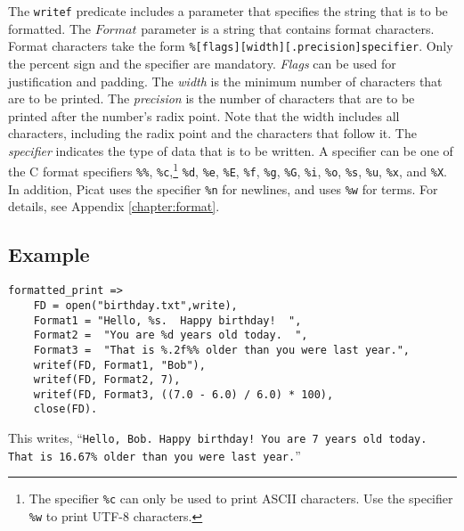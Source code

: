The \texttt{writef} predicate includes a parameter that specifies the string that is to be formatted.  The $Format$ parameter is a string that contains format characters.  Format characters take the form \texttt{\%[flags][width][.precision]specifier}.  Only the percent sign and the specifier are mandatory.  \emph{Flags} can be used for justification and padding.  The \emph{width} is the minimum number of characters that are to be printed.  The \emph{precision} is the number of characters that are to be printed after the number's radix point.  Note that the width includes all characters, including the radix point and the characters that follow it.  The \emph{specifier} indicates the type of data that is to be written.  A specifier can be one of the C format specifiers \texttt{\%\%}, \texttt{\%c},\footnote{The specifier \texttt{\%c} can only be used to print ASCII characters. Use the specifier \texttt{\%w} to print UTF-8 characters.}  \texttt{\%d}, \texttt{\%e}, \texttt{\%E}, \texttt{\%f}, \texttt{\%g}, \texttt{\%G}, \texttt{\%i}, \texttt{\%o}, \texttt{\%s}, \texttt{\%u}, \texttt{\%x}, and \texttt{\%X}.  In addition, Picat uses the specifier \texttt{\%n} for newlines, and uses \texttt{\%w} for terms.  For details, see Appendix \ref{chapter:format}.

\subsection*{Example}
\begin{verbatim}
formatted_print =>
    FD = open("birthday.txt",write),
    Format1 = "Hello, %s.  Happy birthday!  ",
    Format2 =  "You are %d years old today.  ", 
    Format3 =  "That is %.2f%% older than you were last year.",
    writef(FD, Format1, "Bob"),
    writef(FD, Format2, 7),
    writef(FD, Format3, ((7.0 - 6.0) / 6.0) * 100),
    close(FD).
\end{verbatim}

This writes, ``\texttt{Hello, Bob.  Happy birthday!  You are 7 years old today.  That is 16.67\% older than you were last year.}''
    
